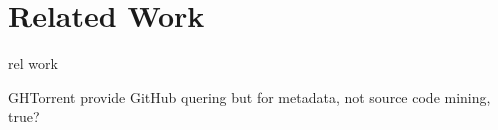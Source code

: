 
\section{Related Work} \label{sec:relatedwork}

rel work


GHTorrent \cite{Gousi13} provide GitHub quering but for metadata, not source code mining, true?
